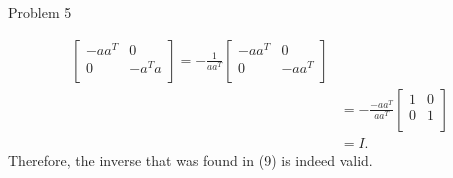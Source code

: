\begin{problem}{Problem 5}
\begin{Highlight}
\begin{align}
\begin{bmatrix}
                -aa^{T} & 0 \\
                0 & -a^{T}a \\
            \end{bmatrix}
            = -\frac{1}{aa^{T}}
            \begin{bmatrix}
                -aa^{T} & 0 \\
                0 & -aa^{T} \\
            \end{bmatrix} \\
            & = -\frac{-aa^{T}}{aa^{T}}
            \begin{bmatrix}
                1 & 0 \\
                0 & 1 \\
            \end{bmatrix} \\
            & = I.
        \end{align}
        Therefore, the inverse that was found in (9) is indeed valid.
    \end{Highlight}
\end{problem}

